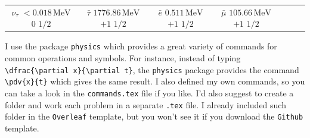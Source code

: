 \documentclass[letterpaper]{article}
\begin{document}
\begin{center}
\begin{tabular}{|c|c|c|c|c|c|c|}
\parbox[c][5em][c]{2cm}{\centering \textbf{$\nu_\tau$} \\ $<0.018\,\text{MeV}$ \\ $0$ \\ $1/2$} &
\parbox[c][5em][c]{2cm}{\centering \textbf{$\bar{\tau}$} \\ $1776.86\,\text{MeV}$ \\ $+1$ \\ $1/2$} &
\parbox[c][5em][c]{2cm}{\centering \textbf{$\bar{e}$} \\ $0.511\,\text{MeV}$ \\ $+1$ \\ $1/2$} &
\parbox[c][5em][c]{2cm}{\centering \textbf{$\bar{\mu}$} \\ $105.66\,\text{MeV}$ \\ $+1$ \\ $1/2$} &
\end{tabular}
\end{center}





I use the package \texttt{physics} which provides a great variety of commands for common operations and symbols. For instance, instead of typing \verb|\dfrac{\partial x}{\partial t}|, the \texttt{physics} package provides the command \verb|\pdv{x}{t}| which gives the same result. I also defined my own commands, so you can take a look in the \texttt{commands.tex} file if you like. I'd also suggest to create a folder and work each problem in a separate \texttt{.tex} file. I already included such folder in the \texttt{Overleaf} template, but you won't see it if you download the \texttt{Github} template. 






\end{document}
